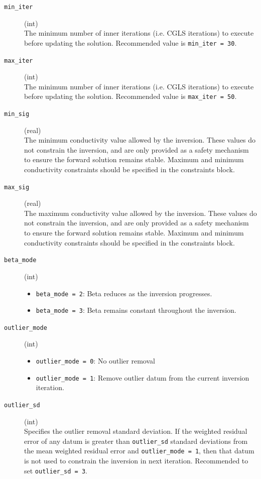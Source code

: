 \documentclass[a4paper,12pt]{article}
\begin{document}
\begin{description}
     \item[\texttt{min\_iter}] (int)\hfill \\
     The minimum number of inner iterations (i.e. CGLS iterations) to execute before updating the solution. Recommended value is \texttt{min\_iter = 30}.

     \item[\texttt{max\_iter}] (int)\hfill \\
     The minimum number of inner iterations (i.e. CGLS iterations) to execute before updating the solution. Recommended value is \texttt{max\_iter = 50}.

     \item[\texttt{min\_sig}] (real)\hfill \\
     The minimum conductivity value allowed by the inversion. These values do not constrain the inversion, and are only provided as a safety mechanism to ensure the forward solution remains stable. Maximum and minimum conductivity constraints should be specified in the constraints block.

     \item[\texttt{max\_sig}] (real)\hfill \\
     The maximum conductivity value allowed by the inversion. These values do not constrain the inversion, and are only provided as a safety mechanism to ensure the forward solution remains stable. Maximum and minimum conductivity constraints should be specified in the constraints block.

     \item[\texttt{beta\_mode}] (int)\hfill \\
    \begin{itemize}
        \item \texttt{beta\_mode = 2}: Beta reduces as the inversion progresses.
        \item \texttt{beta\_mode = 3}: Beta remains constant throughout the inversion.
    \end{itemize}

    \item[\texttt{outlier\_mode}] (int)\hfill \\
    \begin{itemize}
        \item \texttt{outlier\_mode = 0}: No outlier removal
        \item \texttt{outlier\_mode = 1}: Remove outlier datum from the current inversion iteration.
    \end{itemize}

    \item[\texttt{outlier\_sd}] (int)\hfill \\
    Specifies the outlier removal standard deviation. If the weighted residual error of any datum is greater than \texttt{outlier\_sd} standard deviations from the mean weighted residual error and \texttt{outlier\_mode = 1}, then that datum is not used to constrain the inversion in next iteration. Recommended to set \texttt{outlier\_sd = 3}.

\end{description}
\end{document}

